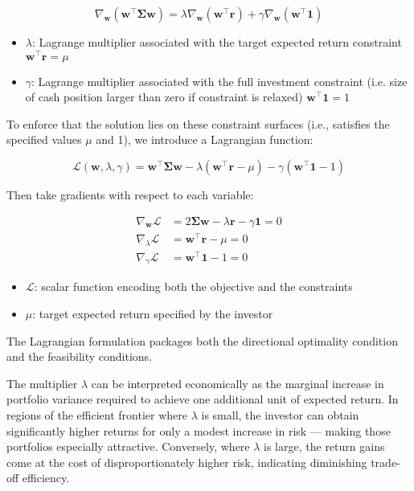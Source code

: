 \[
\nabla_{\mathbf{w}} \left( \mathbf{w}^\top \boldsymbol{\Sigma} \mathbf{w} \right)
= \lambda \nabla_{\mathbf{w}} \left( \mathbf{w}^\top \mathbf{r} \right)
+ \gamma \nabla_{\mathbf{w}} \left( \mathbf{w}^\top \mathbf{1} \right)
\]

\begin{itemize}
  \item[] \( \lambda \): Lagrange multiplier associated with the target expected return constraint \( \mathbf{w}^\top \mathbf{r} = \mu \)
  \item[] \( \gamma \): Lagrange multiplier associated with the full investment constraint (i.e. size of cash position larger than zero if constraint is relaxed) \( \mathbf{w}^\top \mathbf{1} = 1 \)
\end{itemize}

\vspace{0.27cm} To enforce that the solution lies on these constraint surfaces (i.e., satisfies the specified values \( \mu \) and 1), we introduce a Lagrangian function:

\[
\mathcal{L}(\mathbf{w}, \lambda, \gamma) = 
\mathbf{w}^\top \boldsymbol{\Sigma} \mathbf{w} 
- \lambda (\mathbf{w}^\top \mathbf{r} - \mu) 
- \gamma (\mathbf{w}^\top \mathbf{1} - 1)
\]

\vspace{0.27cm} Then take gradients with respect to each variable:

\[
\begin{aligned}
\nabla_{\mathbf{w}} \mathcal{L} &= 2\boldsymbol{\Sigma} \mathbf{w} - \lambda \mathbf{r} - \gamma \mathbf{1} = 0 \\
\nabla_{\lambda} \mathcal{L} &= \mathbf{w}^\top \mathbf{r} - \mu = 0 \\
\nabla_{\gamma} \mathcal{L} &= \mathbf{w}^\top \mathbf{1} - 1 = 0
\end{aligned}
\]

\begin{itemize}
  \item[] \( \mathcal{L} \): scalar function encoding both the objective and the constraints
  \item[] \( \mu \): target expected return specified by the investor
\end{itemize}

\vspace{0.27cm} The Lagrangian formulation packages both the directional optimality condition and the feasibility conditions. 

The multiplier \( \lambda \) can be interpreted economically as the marginal increase in portfolio variance required to achieve one additional unit of expected return. In regions of the efficient frontier where \( \lambda \) is small, the investor can obtain significantly higher returns for only a modest increase in risk --- making those portfolios especially attractive. Conversely, where \( \lambda \) is large, the return gains come at the cost of disproportionately higher risk, indicating diminishing trade-off efficiency.

